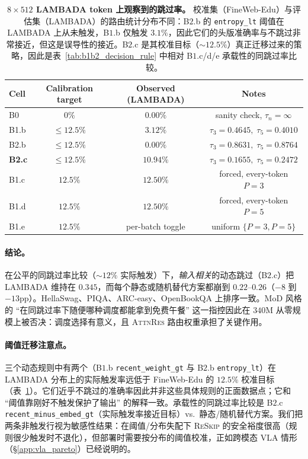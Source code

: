 \documentclass{article}
\newcommand{\attnres}{\textsc{AttnRes}}
\newcommand{\reskip}{\textsc{ReSkip}}
\begin{document}
\begin{table}[h]
\caption{\textbf{$8\times512$ LAMBADA token 上观察到的跳过率。} 校准集（FineWeb-Edu）与评估集（LAMBADA）的路由统计分布不同：B$2.$b 的 \texttt{entropy\_lt} 阈值在 LAMBADA 上从未触发，B$1.$b 仅触发 $3.1\%$，因此它们的头版准确率与不跳过非常接近，但这是误导性的接近。B$2.$c 是其校准目标（$\sim$$12.5\%$）真正迁移过来的策略，因此是表~\ref{tab:b1b2_decision_rule} 中相对 B$1.$c/d/e 承载性的同跳过率比较。}
\label{tab:b1b2_observed_rate}
\centering\small
\begin{tabular}{lccc}
\toprule
Cell & Calibration target & Observed (LAMBADA) & Notes \\
\midrule
B0  & $0\%$        & $0.00\%$  & sanity check, $\tau_n{=}\infty$ \\
B1.b & $\le 12.5\%$ & $3.12\%$  & $\tau_3{=}0.4645,\;\tau_5{=}0.4010$ \\
B2.b & $\le 12.5\%$ & $0.00\%$  & $\tau_3{=}0.8631,\;\tau_5{=}0.8764$ \\
\textbf{B2.c} & $\le 12.5\%$ & $\mathbf{10.94\%}$ & $\tau_3{=}0.1655,\;\tau_5{=}0.2472$ \\
B1.c & $12.5\%$     & $12.50\%$ & forced, every-token $P{=}3$ \\
B1.d & $12.5\%$     & $12.50\%$ & forced, every-token $P{=}5$ \\
B1.e & $12.5\%$     & per-batch toggle & uniform $\{P{=}3, P{=}5\}$ \\
\bottomrule
\end{tabular}
\end{table}

\paragraph{结论。} 在公平的同跳过率比较（$\sim$$12\%$ 实际触发）下，\emph{输入相关}的动态跳过（B$2.$c）把 LAMBADA 维持在 $0.345$，而每个静态或随机替代方案都崩到 $0.22$--$0.26$（$-8$ 到 $-13$pp）。HellaSwag、PIQA、ARC-easy、OpenBookQA 上排序一致。MoD 风格的 ``在同跳过率下随便哪种调度都能拿到免费午餐'' 这一指控因此在 $340$M 从零规模上被否决：调度选择有意义，且 \attnres{} 路由权重承担了关键作用。

\paragraph{阈值迁移注意点。} 三个动态规则中有两个（B$1.$b \texttt{recent\_weight\_gt} 与 B$2.$b \texttt{entropy\_lt}）在 LAMBADA 分布上的实际触发率远低于 FineWeb-Edu 的 $12.5\%$ 校准目标（表~\ref{tab:b1b2_observed_rate}）。它们近乎不跳过的准确率因此并非这些具体规则的正面数据点；它和 ``阈值靠刚好不触发保护了输出'' 的解释一致。承载性的同跳过率比较是 B$2.$c \texttt{recent\_minus\_embed\_gt}（实际触发率接近目标）vs.\ 静态/随机替代方案。我们把两条非触发行视为敏感性结果：在阈值/分布失配下 \reskip{} 的安全裕度很高（规则很少触发时不退化），但部署时需要按分布的阈值校准，正如跨模态 VLA 情形（\S\ref{app:vla_pareto}）已经说明的。
\end{document}
